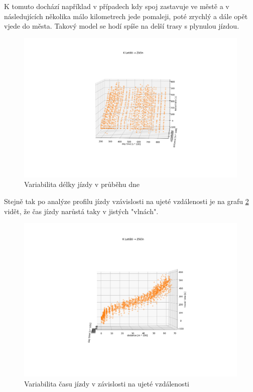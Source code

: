 \bigbreak

K tomuto dochází například v případech kdy spoj zastavuje ve městě a v následujících několika málo kilometrech jede pomaleji, poté zrychlý a dále opět vjede do města. Takový model se hodí spíše na delší trasy s plynulou jízdou.

\begin{figure}
	\centering
  \includegraphics[width=\linewidth]{../img/dojezd_ve_fazich_dne.png}
  \caption{Variabilita délky jízdy v průběhu dne}
  \label{fig:dojezd_ve_fazich_dne}
\end{figure}

Stejně tak po analýze profilu jízdy vzávislosti na ujeté vzdálenosti je na grafu \ref{fig:dojezd_podle_vzdalenosti} vidět, že čas jízdy narůstá taky v jistých "vlnách".

\begin{figure}
	\centering
  \includegraphics[width=\linewidth]{../img/dojezd_podle_vzdalenosti.png}
  \caption{Variabilita času jízdy v závislosti na ujeté vzdálenosti}
  \label{fig:dojezd_podle_vzdalenosti}
\end{figure}

